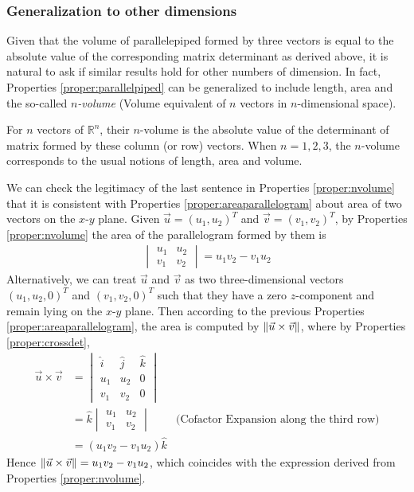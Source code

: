 \subsubsection{Generalization to other dimensions}
Given that the volume of parallelepiped formed by three vectors is equal to the absolute value of the corresponding matrix determinant as derived above, it is natural to ask if similar results hold for other numbers of dimension. In fact, Properties \ref{proper:parallelpiped} can be generalized to include length, area and the so-called \textit{$n$-volume} (Volume equivalent of $n$ vectors in $n$-dimensional space).
\begin{proper}
\label{proper:nvolume}
For $n$ vectors of $\mathbb{R}^n$, their $n$-volume is the absolute value of the determinant of matrix formed by these column (or row) vectors. When $n=1,2,3$, the $n$-volume corresponds to the usual notions of length, area and volume.
\end{proper}
We can check the legitimacy of the last sentence in Properties \ref{proper:nvolume} that it is consistent with Properties \ref{proper:areaparallelogram} about area of two vectors on the $x$-$y$ plane. Given $\vec{u} = (u_1, u_2)^T$ and $\vec{v} = (v_1, v_2)^T$, by Properties \ref{proper:nvolume} the area of the parallelogram formed by them is
\begin{align*}
\begin{vmatrix}
u_1 & u_2 \\
v_1 & v_2
\end{vmatrix} = u_1v_2 - v_1u_2
\end{align*}
Alternatively, we can treat $\vec{u}$ and $\vec{v}$ as two three-dimensional vectors $(u_1, u_2, 0)^T$ and $(v_1, v_2, 0)^T$ such that they have a zero $z$-component and remain lying on the $x$-$y$ plane. Then according to the previous Properties \ref{proper:areaparallelogram}, the area is computed by $\norm{\vec{u} \times \vec{v}}$, where by Properties \ref{proper:crossdet},
\begin{align*}
\vec{u} \times \vec{v} &= 
\begin{vmatrix}
\hat{i} & \hat{j} & \hat{k} \\
u_1 & u_2 & 0 \\
v_1 & v_2 & 0
\end{vmatrix} \\
&= \hat{k}\begin{vmatrix}
u_1 & u_2 \\
v_1 & v_2
\end{vmatrix} & \text{(Cofactor Expansion along the third row)}\\
&= (u_1v_2 - v_1u_2)\hat{k}
\end{align*}
Hence $\norm{\vec{u} \times \vec{v}} = u_1v_2 - v_1u_2$, which coincides with the expression derived from Properties \ref{proper:nvolume}.

